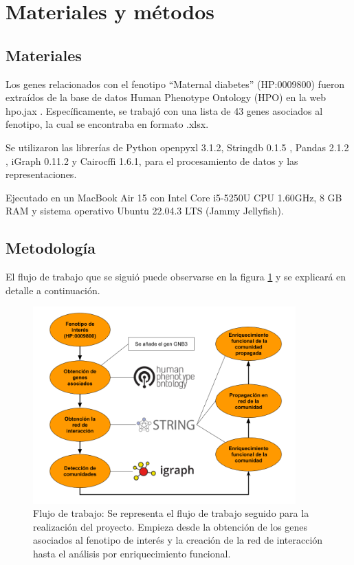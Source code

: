 \section{Materiales y métodos}

\subsection{Materiales}
Los genes relacionados con el fenotipo ``Maternal diabetes'' (HP:0009800) fueron extraídos de la base de datos Human Phenotype Ontology (HPO) en la web hpo.jax \cite{Kohler2017}. Específicamente, se trabajó con una lista de 43 genes asociados al fenotipo, la cual se encontraba en formato .xlsx.

Se utilizaron las librerías de Python
openpyxl 3.1.2, Stringdb 0.1.5 \cite{Mering2005}, Pandas 2.1.2 \cite{McKinney2015}, iGraph 0.11.2 \cite{Csardi2006} y Cairocffi 1.6.1, para el procesamiento de datos y las representaciones.


Ejecutado en un MacBook Air 15 con Intel Core i5-5250U CPU 1.60GHz, 8 GB RAM y sistema operativo Ubuntu 22.04.3 LTS (Jammy Jellyfish).

\subsection{Metodología}

El flujo de trabajo que se siguió puede observarse en la figura \ref{fig:workflow} y se explicará en detalle a continuación.

\begin{figure}[h!]
	\includegraphics[width=0.9\textwidth]{figures/workflow.png}
	\caption{Flujo de trabajo: Se representa el flujo de trabajo seguido para la realización del proyecto. Empieza desde la obtención de los genes asociados al fenotipo de interés y la creación de la red de interacción hasta el análisis por enriquecimiento funcional.}
	\label{fig:workflow}
\end{figure}

